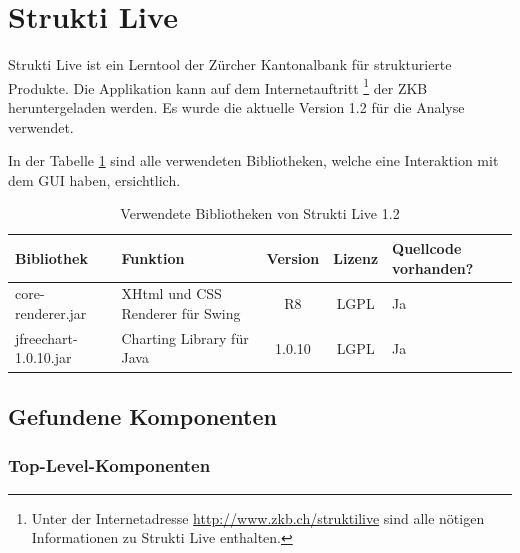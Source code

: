   \section{Strukti Live}
  
  Strukti Live ist ein Lerntool der Zürcher Kantonalbank für strukturierte
  Produkte. Die Applikation kann auf dem Internetauftritt \footnote{Unter der
  Internetadresse \url{http://www.zkb.ch/struktilive} sind alle nötigen
  Informationen zu Strukti Live enthalten.} der \ac{ZKB} heruntergeladen
  werden. Es wurde die aktuelle Version 1.2 für die Analyse verwendet.
  
  In der Tabelle \ref{tab:bibliothekenStruktiLive} sind alle verwendeten
  Bibliotheken, welche eine Interaktion mit dem \ac{GUI} haben, ersichtlich.
  \newline
  
  \begin{table}[ht]
    \begin{center}
      \begin{tabular}{lp{4.5cm}ccp{2cm}}
        \toprule
        Bibliothek & Funktion & Version & Lizenz & Quellcode vorhanden?\\
        \midrule
        core-renderer.jar & XHtml und CSS Renderer für Swing & R8 & LGPL & Ja\\
        jfreechart-1.0.10.jar & Charting Library für Java & 1.0.10 & LGPL & Ja\\
        \bottomrule
      \end{tabular}
      \caption{Verwendete Bibliotheken von Strukti Live 1.2}
      \label{tab:bibliothekenStruktiLive}
    \end{center}
  \end{table}
  
  \subsection{Gefundene Komponenten}
  
  \subsubsection{Top-Level-Komponenten}
  
